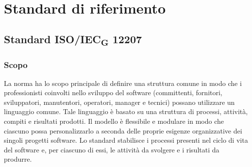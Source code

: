 \appendix
\section{Standard di riferimento}
\subsection{Standard ISO/IEC\textsubscript{G} 12207}
\subsubsection{Scopo}
La norma ha lo scopo principale di definire una struttura comune in modo che i professionisti coinvolti nello sviluppo del software (committenti, fornitori, sviluppatori, manutentori, operatori, manager e tecnici) possano utilizzare un linguaggio comune. Tale linguaggio è basato su una struttura di processi, attività, compiti e risultati prodotti. Il modello è flessibile e modulare in modo che ciascuno possa personalizzarlo a seconda delle proprie esigenze organizzative dei singoli progetti software.
Lo standard stabilisce i processi presenti nel ciclo di vita del software e, per ciascuno di essi, le attività da svolgere e i risultati da produrre.
